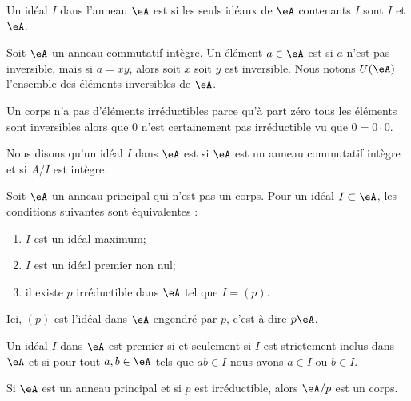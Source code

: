 Un idéal \( I\) dans l'anneau \( \eA\) est  si les seuls idéaux de \( \eA\) contenants \( I\) sont \( I\) et \( \eA\).

\begin{definition}  \label{DeirredBDhQfA}
    Soit \( \eA\) un anneau commutatif intègre. Un élément \( a\in\eA\) est  si \( a\) n'est pas inversible, mais si \( a=xy\), alors soit \( x\) soit \( y\) est inversible. Nous notons \( U(\eA)\) l'ensemble des éléments inversibles de \( \eA\).
\end{definition}

\begin{remark}
    Un corps n'a pas d'éléments irréductibles parce qu'à part zéro tous les éléments sont inversibles alors que \( 0\) n'est certainement pas irréductible vu que \( 0=0\cdot 0\).
\end{remark}


\begin{definition}
    Nous disons qu'un idéal \( I\) dans \( \eA\) est  si \( \eA\) est un anneau commutatif intègre et si \( A/I\) est intègre.
\end{definition}

\begin{proposition} \label{PropomqcGe}
    Soit \( \eA\) un anneau principal qui n'est pas un corps. Pour un idéal \( I\subset \eA\), les conditions suivantes sont équivalentes :
    \begin{enumerate}
        \item
            \( I\) est un idéal maximum;
        \item
            \( I\) est un idéal premier non nul;
        \item
            il existe \( p\) irréductible dans \( \eA\) tel que \( I=(p)\).
    \end{enumerate}
\end{proposition}
Ici, \( (p)\) est l'idéal dans \( \eA\) engendré par \( p\), c'est à dire \( p\eA\).

\begin{proposition}
    Un idéal \( I\) dans \( \eA\) est premier si et seulement si \( I\) est strictement inclus dans \( \eA\) et si pour tout \( a,b\in\eA\) tels que \( ab\in I\) nous avons \( a\in I\) ou \( b\in I\).
\end{proposition}

\begin{proposition}     \label{PropoTMMXCx}
    Si \( \eA\) est un anneau principal et si \( p\) est irréductible, alors \( \eA/p\) est un corps.
\end{proposition}

